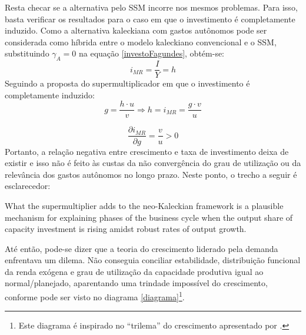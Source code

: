 Resta checar se a alternativa pelo SSM incorre nos mesmos problemas. Para isso, basta verificar os resultados para o caso em que o investimento é completamente induzido. Como a alternativa kaleckiana com gastos autônomos pode ser considerada como híbrida entre o modelo kaleckiano convencional e o SSM, substituindo $\gamma_A = 0$ na equação \ref{investoFagundes}, obtém-se:
$$
i_{MR} = \frac{I}{Y} =  h
$$
Seguindo a proposta do supermultiplicador em que o investimento é completamente induzido:
$$
g = \frac{h\cdot u}{v} \Rightarrow h = i_{MR} = \frac{g\cdot v}{u}
$$

$$
\frac{\partial i_{MR}}{\partial g} = \frac{v}{u} > 0
$$
Portanto, a relação negativa entre crescimento e taxa de investimento deixa de existir e isso não é feito às custas da não convergência do grau de utilização ou da relevância dos gastos autônomos no longo prazo. Neste ponto, o trecho a seguir é esclarecedor:

\begin{citacao}
	What the supermultiplier adds to the neo-Kaleckian framework is a plausible mechanism for explaining phases
	of the business cycle when the output share of capacity investment is rising amidst robust rates of output growth. \cite[p.~9]{fiebiger_trend_2017}
\end{citacao}
Até então, pode-se dizer que a teoria do crescimento liderado pela demanda enfrentava um dilema. Não conseguia conciliar estabilidade, distribuição funcional da renda exógena e grau de utilização da capacidade produtiva igual ao normal/planejado, aparentando uma trindade impossível do crescimento, conforme pode ser visto no diagrama \ref{diagrama}\footnote{Este diagrama é inspirado no ``trilema'' do crescimento apresentado por \textcite{cesaratto_neo-kaleckian_2015}.}.


